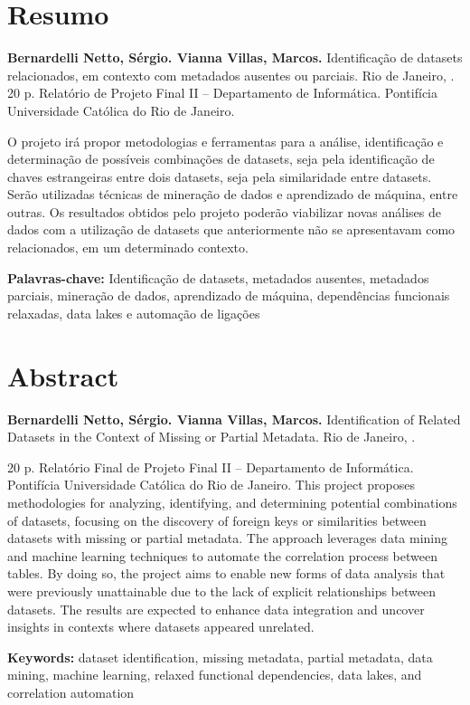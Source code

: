 \documentclass[12pt, a4paper]{article}
\begin{document}
\newpage
\section*{Resumo}
\begin{singlespace}
\textbf{Bernardelli Netto, Sérgio. 
Vianna Villas, Marcos.} 
Identificação de datasets relacionados, em contexto com metadados ausentes ou parciais. 
Rio de Janeiro, \the\year.
20 p. Relatório de Projeto Final II -- Departamento de Informática. 
Pontifícia Universidade Católica do Rio de Janeiro.

\vspace{0.3cm}
O projeto irá propor metodologias e ferramentas para a análise, identificação e determinação de possíveis combinações de datasets, seja pela identificação de chaves estrangeiras entre dois datasets, seja pela similaridade entre datasets. 
Serão utilizadas técnicas de mineração de dados e aprendizado de máquina, entre outras. 
Os resultados obtidos pelo projeto poderão viabilizar novas análises de dados com a utilização de datasets que anteriormente não se apresentavam como relacionados, em um determinado contexto.

\vspace{0.3cm}

\textbf{Palavras-chave:} 
Identificação de datasets, metadados ausentes, metadados parciais, mineração de dados, aprendizado de máquina, dependências funcionais relaxadas, data lakes e automação de ligações 
\end{singlespace}

\section*{Abstract}
\begin{singlespace}
\textbf{Bernardelli Netto, Sérgio. 
Vianna Villas, Marcos.} 
Identification of Related Datasets in the Context of Missing or Partial Metadata. 
Rio de Janeiro, \the\year.

20 p. Relatório Final de Projeto Final II -- Departamento de Informática.
Pontifícia Universidade Católica do Rio de Janeiro.
\vspace{0.3cm}
This project proposes methodologies for analyzing, identifying, and determining potential combinations of datasets, focusing on the discovery of foreign keys or similarities between datasets with missing or partial metadata. 
The approach leverages data mining and machine learning techniques to automate the correlation process between tables. 
By doing so, the project aims to enable new forms of data analysis that were previously unattainable due to the lack of explicit relationships between datasets. 
The results are expected to enhance data integration and uncover insights in contexts where datasets appeared unrelated. 
\vspace{0.3cm}

\textbf{Keywords:} 
dataset identification, missing metadata, partial metadata, data mining, machine learning, relaxed functional dependencies, data lakes, and correlation automation 
\end{singlespace}
\end{document}
